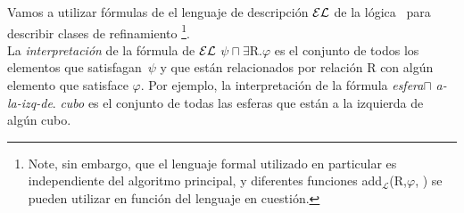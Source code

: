 Vamos a utilizar f\'ormulas de el lenguaje de descripci\'on $\mathcal{EL}$ de la l\'ogica~\cite{baad:desc03} para describir clases de refinamiento \footnote {Note, sin embargo, que el lenguaje formal utilizado en particular es independiente del algoritmo principal, y diferentes funciones add$_{\mathcal {L}}$(R,$\varphi $, \RE) se pueden utilizar en funci\'on del lenguaje en cuesti\'on.}.\\
La {\it interpretaci\'on} de la f\'ormula de $\mathcal{EL}$  $\psi \sqcap \exists $R.$ \varphi$ es el conjunto de todos los elementos que satisfagan~$\psi$ y que est\'an relacionados por relaci\'on R con alg\'un elemento que satisface $\varphi $.
Por ejemplo, la interpretaci\'on de la f\'ormula \emph{esfera}$\sqcap$ \emph{a-la-izq-de}. \emph{cubo} es el conjunto de todas las esferas que est\'an a la izquierda de alg\'un cubo.\\





